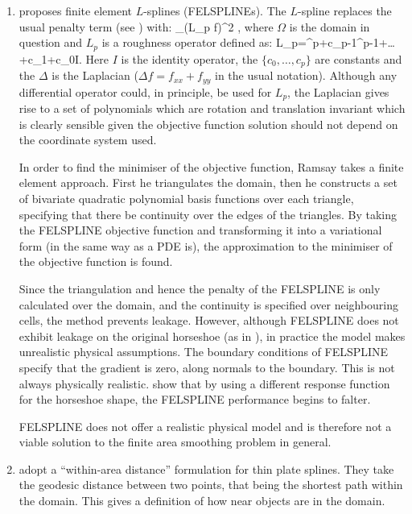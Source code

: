 \begin{enumerate}
\item \cite{ramsay} proposes finite element $L$-splines (FELSPLINEs). The $L$-spline replaces the usual penalty term (see ) with:
\be
\int_\Omega (L_p f)^2 \Omega,
\ee
where $\Omega$ is the domain in question and $L_p$ is a roughness operator defined as:
\be
L_p=\Delta^p+c_{p-1}\Delta^{p-1}+\dots+c_1\Delta+c_0I.
\ee
Here $I$ is the identity operator, the $\{c_0,\dots, c_p\}$ are constants and the $\Delta$ is the Laplacian ($\Delta f = f_{xx}+f_{yy}$ in the usual notation). Although any differential operator could, in principle, be used for $L_p$, the Laplacian gives rise to a set of polynomials which are rotation and translation invariant which is clearly sensible given the objective function solution should not depend on the coordinate system used.

In order to find the minimiser of the objective function, Ramsay takes a finite element approach. First he triangulates the domain, then he constructs a set of bivariate quadratic polynomial basis functions over each triangle, specifying that there be continuity over the edges of the triangles. By taking the FELSPLINE objective function and transforming it into a variational form (in the same way as a PDE is), the approximation to the minimiser of the objective function is found. 

Since the triangulation and hence the penalty of the FELSPLINE is only calculated over the domain, and the continuity is specified over neighbouring cells, the method prevents leakage. However, although FELSPLINE does not exhibit leakage on the original horseshoe (as in ), in practice the model makes unrealistic physical assumptions. The boundary conditions of FELSPLINE specify that the gradient is zero, along normals to the boundary. This is not always physically realistic. \cite{soap} show that by using a different response function for the horseshoe shape, the FELSPLINE performance begins to falter.

FELSPLINE does not offer a realistic physical model and is therefore not a viable solution to the finite area smoothing problem in general.

\item \cite{wangranalli} adopt a ``within-area distance'' formulation for thin plate splines. They take the geodesic distance between two points, that being the shortest path within the domain. This gives a definition of how near objects are in the domain. 


\end{enumerate}
